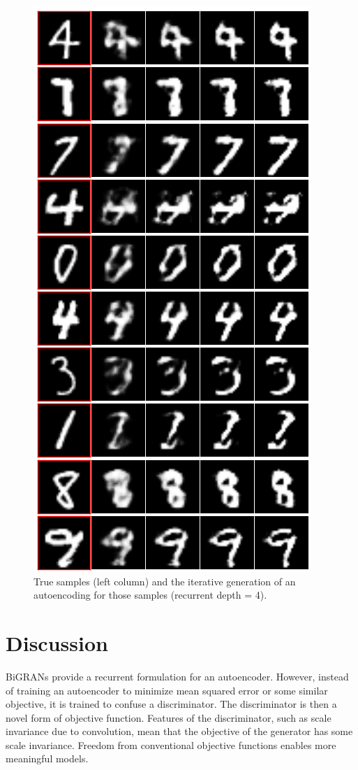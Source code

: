 \documentclass{article}
\begin{document}
\begin{figure}[h]
\caption{True samples (left column) and the iterative generation of an autoencoding for those samples (recurrent depth = 4).}
\label{fig:drawn}
\includegraphics[scale=0.3]{images/drawing.png}
\centering
\end{figure}

 \section{Discussion}
 
BiGRANs provide a recurrent formulation for an autoencoder. However, instead of training an autoencoder to minimize mean squared error or some similar objective, it is trained to confuse a discriminator. The discriminator is then a novel form of objective function. Features of the discriminator, such as scale invariance due to convolution, mean that the objective of the generator has some scale invariance. Freedom from conventional objective functions enables more meaningful models. 
\end{document}
